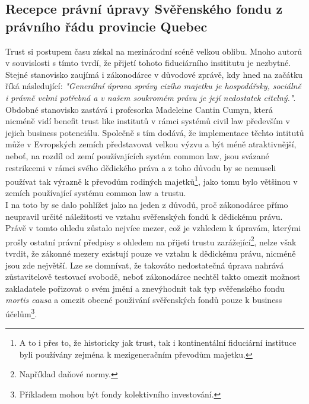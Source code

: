 \documentclass{article}
\begin{document}
\newpage

\subsection{Recepce právní úpravy Svěřenského fondu z právního řádu provincie Quebec}


Trust si postupem času získal na mezinárodní scéně velkou oblibu. Mnoho autorů v souvislosti s tímto tvrdí, že přijetí tohoto fiduciárního insititutu je nezbytné. Stejné stanovisko zaujímá i zákonodárce v důvodové zprávě, kdy hned na začátku říká následující: \textit{"Generální úprava správy cizího majetku je hospodářsky, sociálně i právně velmi potřebná a v našem soukromém právu je její nedostatek citelný."}.\\

Obdobné stanovisko zastává i profesorka Madeleine Cantin Cumyn, která nicméně vidí benefit trust like institutů v rámci systémů civil law především v jejich business potenciálu. Společně s tím dodává, že implementace těchto intitutů může v Evropských zemích představovat velkou výzvu a být méně atraktivnější, neboť, na rozdíl od zemí používajících systém common law, jsou svázané restrikcemi v rámci svého dědického práva a z toho důvodu by se nemuseli používat tak výrazně k převodům rodiných majetků\footnote{A to i přes to, že historicky jak trust, tak i kontinentální fiduciární instituce byli používány zejména k mezigeneračním převodům majetku.}, jako tomu bylo většinou v zemích používající systému common law a trustu.\\


I na toto by se dalo pohlížet jako na jeden z důvodů, proč zákonodárce přímo neupravil určité náležitosti ve vztahu svěřenských fondů k dědickému právu. Právě v tomto ohledu zůstalo nejvíce mezer, což je vzhledem k úpravám, kterými prošly ostatní právní předpisy s ohledem na přijetí trustu zarážející\footnote{Například daňové normy.}, nelze však tvrdit, že zákonné mezery existují pouze ve vztahu k dědickému právu, nicméně jsou zde největší. Lze se domnívat, že takováto nedostatečná úprava nahrává zůstavitelově testovací svobodě, neboť zákonodárce nechtěl takto omezit možnost zakladatele pořizovat o svém jmění a znevýhodnit tak typ svěřenského fondu \textit{mortis causa} a omezit obecné použivání svěřenských fondů pouze k business účelům\footnote{Příkladem mohou být fondy kolektivního investování.}.\\
\end{document}
